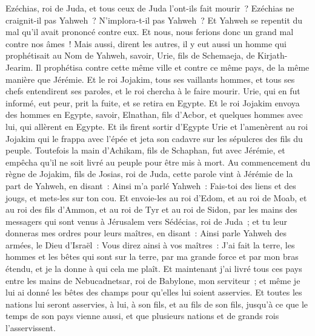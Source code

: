 \begin{multicols}{2}
Ezéchias, roi de Juda, et tous ceux de Juda l'ont-ils fait mourir~? Ezéchias ne craignit-il pas Yahweh~? N'implora-t-il pas Yahweh~? Et Yahweh se repentit du mal qu'il avait prononcé contre eux. Et nous, nous ferions donc un grand mal contre nos âmes~!
Mais aussi, dirent les autres, il y eut aussi un homme qui prophétisait au Nom de Yahweh, savoir, Urie, fils de Schemaeja, de Kirjath-Jearim. Il prophétisa contre cette même ville et contre ce même pays, de la même manière que Jérémie.
Et le roi Jojakim, tous ses vaillants hommes, et tous ses chefs entendirent ses paroles, et le roi chercha à le faire mourir. Urie, qui en fut informé, eut peur, prit la fuite, et se retira en Egypte.
Et le roi Jojakim envoya des hommes en Egypte, savoir, Elnathan, fils d'Acbor, et quelques hommes avec lui, qui allèrent en Egypte.
Et ils firent sortir d'Egypte Urie et l'amenèrent au roi Jojakim qui le frappa avec l'épée et jeta son cadavre sur les sépulcres des fils du peuple.
Toutefois la main d'Achikam, fils de Schaphan, fut avec Jérémie, et empêcha qu'il ne soit livré au peuple pour être mis à mort.
\VerseOne{}Au commencement du règne de Jojakim, fils de Josias, roi de Juda, cette parole vint à Jérémie de la part de Yahweh, en disant~:
Ainsi m'a parlé Yahweh~: Fais-toi des liens et des jougs, et mets-les sur ton cou.
Et envoie-les au roi d'Edom, et au roi de Moab, et au roi des fils d'Ammon, et au roi de Tyr et au roi de Sidon, par les mains des messagers qui sont venus à Jérusalem vers Sédécias, roi de Juda~;
et tu leur donneras mes ordres pour leurs maîtres, en disant~: Ainsi parle Yahweh des armées, le Dieu d'Israël~: Vous direz ainsi à vos maîtres~:
J'ai fait la terre, les hommes et les bêtes qui sont sur la terre, par ma grande force et par mon bras étendu, et je la donne à qui cela me plaît.
Et maintenant j'ai livré tous ces pays entre les mains de Nebucadnetsar, roi de Babylone, mon serviteur~; et même je lui ai donné les bêtes des champs pour qu'elles lui soient asservies.
Et toutes les nations lui seront asservies, à lui, à son fils, et au fils de son fils, jusqu'à ce que le temps de son pays vienne aussi, et que plusieurs nations et de grands rois l'asservissent.

\end{multicols}
